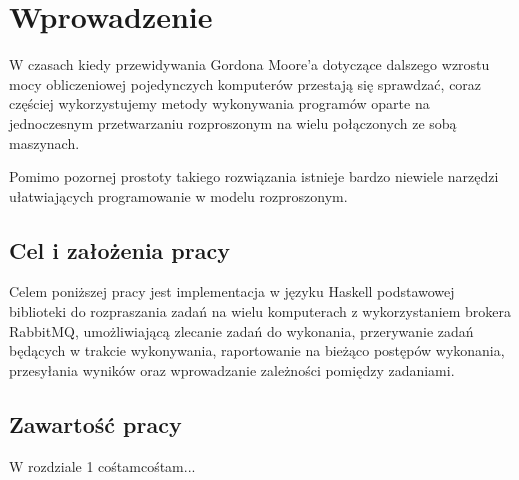 
\chapter{Wprowadzenie}
\label{cha:wprowadzenie}
W czasach kiedy przewidywania Gordona Moore'a dotyczące dalszego wzrostu mocy obliczeniowej pojedynczych komputerów przestają się sprawdzać, coraz częściej wykorzystujemy metody wykonywania programów oparte na jednoczesnym przetwarzaniu rozproszonym na wielu połączonych ze sobą maszynach. 

Pomimo pozornej prostoty takiego rozwiązania istnieje bardzo niewiele narzędzi ułatwiających programowanie w modelu rozproszonym.

\section{Cel i założenia pracy}
\label{sec:celePracy}
Celem poniższej pracy jest implementacja w języku Haskell podstawowej biblioteki do rozpraszania zadań na wielu komputerach z wykorzystaniem brokera RabbitMQ, umożliwiającą zlecanie zadań do wykonania, przerywanie zadań będących w trakcie wykonywania, raportowanie na bieżąco postępów wykonania, przesyłania wyników oraz wprowadzanie zależności pomiędzy zadaniami.

\section{Zawartość pracy}
\label{sec:zawartoscPracy}
W rozdziale 1 cośtamcośtam...

















